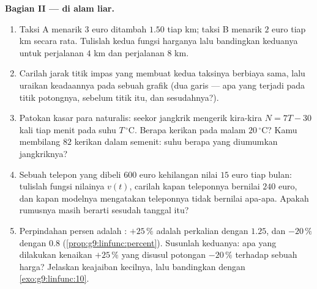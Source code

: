\begin{problem}
\medskip
\noindent\textbf{Bagian II ---  di alam liar.}
\begin{enumerate}[resume]
  \item Taksi A menarik $3$ euro ditambah $1.50$ tiap km; taksi B
        menarik $2$ euro tiap km secara rata. Tulislah kedua fungsi
        harganya lalu bandingkan keduanya untuk perjalanan $4$ km dan
        perjalanan $8$ km.
  \item Carilah jarak titik impas yang membuat kedua taksinya
        berbiaya sama, lalu uraikan keadaannya pada sebuah grafik
        (dua garis --- apa yang terjadi pada titik potongnya, sebelum
        titik itu, dan sesudahnya?).
  \item Patokan kasar para naturalis: seekor jangkrik mengerik
        kira-kira $N = 7T - 30$ kali tiap menit pada suhu
        $T\,^\circ$C. Berapa kerikan pada malam
        $20\,^\circ$C? Kamu membilang $82$ kerikan dalam semenit:
        suhu berapa yang diumumkan jangkriknya?
  \item Sebuah telepon yang dibeli $600$ euro kehilangan nilai $15$
        euro tiap bulan: tulislah fungsi nilainya $v(t)$, carilah
        kapan teleponnya bernilai $240$ euro, dan kapan modelnya
        mengatakan teleponnya tidak bernilai apa-apa. Apakah rumusnya
        masih berarti sesudah tanggal itu?
  \item Perpindahan persen adalah : $+25\,\%$ adalah
        perkalian dengan $1.25$, dan $-20\,\%$ dengan $0.8$
        (\cref{prop:g9:linfunc:percent}). Susunlah keduanya: apa yang
        dilakukan kenaikan $+25\,\%$ yang disusul potongan
        $-20\,\%$ terhadap sebuah harga? Jelaskan keajaiban kecilnya,
        lalu bandingkan dengan \cref{exo:g9:linfunc:10}.
\end{enumerate}


\end{problem}
